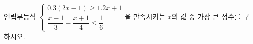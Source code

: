 연립부등식 $\begin{cases} 0.3(2x-1)\ge 1.2x+1 \\ \dfrac{x-1}{3}-\dfrac{x+1}{4}\le\dfrac{1}{6} \end{cases}$을 만족시키는 $x$의 값 중 가장 큰 정수를 구하시오.
